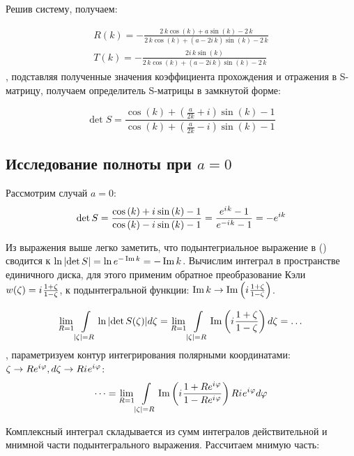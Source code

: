 Решив систему, получаем:

\begin{align*}
R(k) = -\frac{2 \, k \cos\left(k\right) + a \sin\left(k\right) - 2 \, k}{2 \, k \cos\left(k\right) + {\left(a - 2 i \, k\right)} \sin\left(k\right) - 2 \, k} \\
T(k) = -\frac{2 i \, k \sin\left(k\right)}{2 \, k \cos\left(k\right) + {\left(a - 2 i \, k\right)} \sin\left(k\right) - 2 \, k}
\end{align*}
, подставляя полученные значения коэффициента прохождения и отражения в S-матрицу, получаем определитель S-матрицы в замкнутой форме:

\begin{equation}\label{eq:ring_detS}
\det S = 
\frac
{\cos\left(k\right) + {\left(\frac{a}{2 k} + i\right)} \sin\left(k\right) - 1}
{\cos\left(k\right) + {\left(\frac{a}{2 k} - i\right)} \sin\left(k\right) - 1}
\end{equation}


\subsection{Исследование полноты при $a=0$}
Рассмотрим случай $a=0$:
\[
\det S
= \frac
{\cos\left(k\right) + {i\mkern1mu} \sin\left(k\right) - 1}
{\cos\left(k\right) - {i\mkern1mu} \sin\left(k\right) - 1}
= \frac{e^{{i\mkern1mu} k} - 1}{e^{-{i\mkern1mu} k} - 1}
= -e^{i k}
\]

Из выражения выше легко заметить, что подынтегриальное выражение в () сводится к $\ln \abs{\det S} = \ln e^{- \operatorname{Im} k} = -\operatorname{Im} k$. Вычислим интеграл в пространстве единичного диска, для этого применим обратное преобразование Кэли $w(\zeta) = {i\mkern1mu} \frac{1 + \zeta}{1 - \zeta}$, к подынтегральной функции: $\operatorname{Im} k \to \operatorname{Im} \left( {i\mkern1mu} \frac{1 + \zeta}{1 - \zeta} \right) $.

\[
  \lim\limits_{R = 1} \int\limits_{\abs{\zeta} = R} \ln \abs{\det S(\zeta)} d \zeta
= \lim\limits_{R = 1} \int\limits_{\abs{\zeta} = R} \operatorname{Im} \left( {i\mkern1mu} \frac{1 + \zeta}{1 - \zeta} \right)  d\zeta = \dots
\]
, параметризуем контур интегрирования полярными координатами: $\zeta \to R e^{{i\mkern1mu} \varphi}, d\zeta \to R {i\mkern1mu} e^{{i\mkern1mu} \varphi}$:
\[
\dots = \lim\limits_{R = 1} \int\limits_{\abs{\zeta} = R} \operatorname{Im} \left( {i\mkern1mu} \frac{1 + R e^{{i\mkern1mu} \varphi}}{1 - R e^{{i\mkern1mu} \varphi}} \right) R {i\mkern1mu} e^{{i\mkern1mu} \varphi} d\varphi
\]

Комплексный интеграл складывается из сумм интегралов действительной и мнимной части подынтегрального выражения. Рассчитаем мнимую часть:

